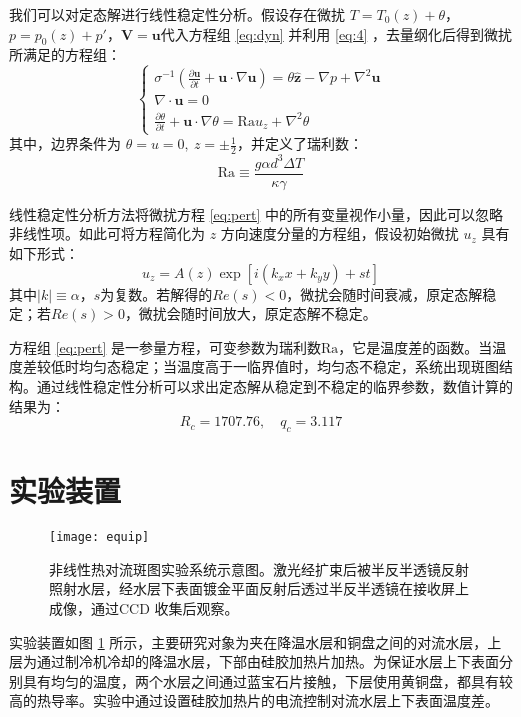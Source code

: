 \documentclass[aps,pre,12pt,preprint,onecolumn,showpacs,showkeys]{revtex4-1}
\def \V {\bm{V}}
\begin{document}
	我们可以对定态解进行线性稳定性分析。假设存在微扰 $T= T_0 (z) + \theta $，$p= p_0(z)+p'$，$\V=\bm u$代入方程组 \ref{eq:dyn} 并利用 \ref{eq:4} ，去量纲化后得到微扰所满足的方程组：
	\begin{equation}\label{eq:pert}
		\left\{
		\begin{array}{c}
			\sigma^{-1} \left(\frac{\partial \bm u}{\partial t}+\bm u\cdot \nabla\bm u\right)=\theta \hat{\bm{z}}-\nabla p+\nabla^2 \bm u\\
			\nabla \cdot \bm u=0\\
			\frac{\partial \theta}{\partial t} + \bm u \cdot \nabla \theta = \mathrm{Ra} u_z + \nabla ^2 \theta
		\end{array}
		\right.
	\end{equation}
	其中，边界条件为 $\theta=u=0,\ z=\pm\frac{1}{2}$，并定义了瑞利数：
	\begin{equation}\label{eq:Ra}
		\mathrm{Ra}\equiv \frac{g\alpha d ^3 \Delta T}{\kappa \gamma}
	\end{equation}
	
	线性稳定性分析方法将微扰方程 \ref{eq:pert} 中的所有变量视作小量，因此可以忽略非线性项。如此可将方程简化为 $z$ 方向速度分量的方程组，假设初始微扰 $u_z$ 具有如下形式：
	\begin{equation}
		u_z = A(z) \exp [i (k_x x +k_y y ) +st]
	\end{equation}
	其中$|k| \equiv\alpha$，$s$为复数。若解得的$Re(s)<0$，微扰会随时间衰减，原定态解稳定；若$Re(s)>0$，微扰会随时间放大，原定态解不稳定。
	
	方程组 \ref{eq:pert} 是一参量方程，可变参数为瑞利数$\mathrm{Ra}$，它是温度差的函数。当温度差较低时均匀态稳定；当温度高于一临界值时，均匀态不稳定，系统出现斑图结构。通过线性稳定性分析可以求出定态解从稳定到不稳定的临界参数，数值计算的结果为：
	\begin{equation}
		R_c=1707.76,\quad q_c=3.117
	\end{equation}

\section{实验装置}
	\begin{figure}[h]
	\centering
	\texttt{[image: equip]}
	\caption{\label{fig:equip}%
	非线性热对流斑图实验系统示意图。激光经扩束后被半反半透镜反射照射水层，经水层下表面镀金平面反射后透过半反半透镜在接收屏上成像，通过CCD 收集后观察。}
	\end{figure}
	实验装置如图 \ref{fig:equip} 所示，主要研究对象为夹在降温水层和铜盘之间的对流水层，上层为通过制冷机冷却的降温水层，下部由硅胶加热片加热。为保证水层上下表⾯分别具有均匀的温度，两个水层之间通过蓝宝石片接触，下层使用黄铜盘，都具有较高的热导率。实验中通过设置硅胶加热片的电流控制对流水层上下表面温度差。
	
\end{document}
